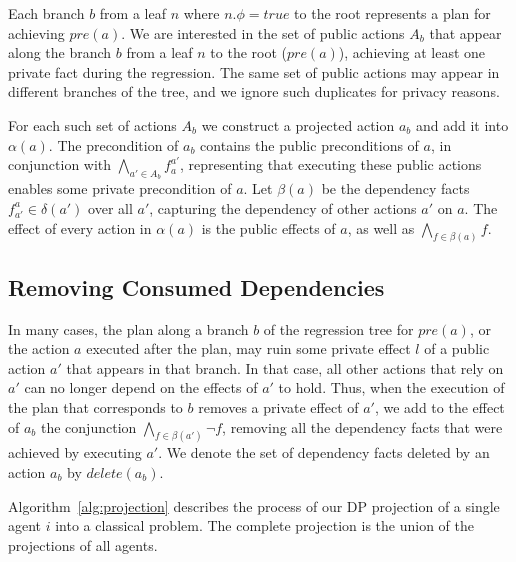 \documentclass[letterpaper]{article}
\theoremstyle{definition}
\begin{document}
Each branch $b$ from a leaf $n$ where $n.\phi=true$ to the root represents a plan for achieving $pre(a)$.
We are interested in the set of public actions $A_b$ that appear along the branch $b$ from a leaf $n$ to the root ($pre(a)$), achieving at least one private fact during the regression. The same set of public actions may appear in different branches of the tree, and we ignore such duplicates for privacy reasons. 

For each such set of actions $A_b$ we construct a projected action $a_b$ and add it into $\alpha(a)$. The precondition of $a_b$ contains the public preconditions of $a$, in conjunction with $\bigwedge_{a' \in A_b}f^{a'}_a$, representing that executing these public actions enables some private precondition of $a$. Let $\beta(a)$ be the dependency facts $f^a_{a'} \in \delta(a')$ over all $a'$, capturing the dependency of other actions $a'$ on $a$. The effect of every action in $\alpha(a)$ is the public effects of $a$, as well as $\bigwedge_{f \in \beta(a)} f$. 


\subsection{Removing Consumed Dependencies}


In many cases, the plan along a branch $b$ of the regression tree for $pre(a)$, or the action $a$ executed after the plan, may ruin some private effect $l$ of a public action $a'$ that appears in that branch. In that case, all other actions that rely on $a'$ can no longer depend on the effects of $a'$ to hold. Thus, when the execution of the plan that corresponds to $b$ removes a private effect of $a'$, we add to the effect of $a_b$ the conjunction $\bigwedge_{f \in \beta(a')} \neg f$, removing all the dependency facts that were achieved by executing $a'$. We denote the set of dependency facts deleted by an action $a_b$ by $delete(a_b)$.

Algorithm~\ref{alg:projection} describes the process of our DP projection of a single agent $i$ into a classical problem. The complete projection is the union of the  projections of all agents.
\end{document}
